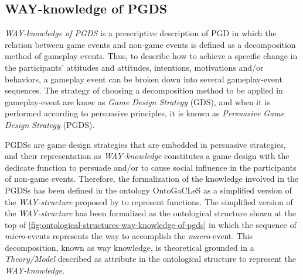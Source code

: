 \subsection{WAY-knowledge of PGDS}
\label{subsec:way-knowledge-of-persuasive-game-design}

\emph{WAY-knowledge of PGDS} is a prescriptive description of PGD in which the relation between game events and non-game events is defined as a decomposition method of gameplay events. Thus, to describe how to achieve a specific change in the participants' attitudes and attitudes, intentions, motivations and/or behaviors, a gameplay event can be broken down into several gameplay-event sequences. The strategy of choosing a decomposition method to be applied in gameplay-event are know as \emph{Game Design Strategy} (GDS), and when it is performed according to persuasive principles, it is known as \emph{Persuasive Game Design Strategy} (PGDS).

PGDSs are game design strategies that are embedded in persuasive strategies, and their representation as \emph{WAY-knowledge} constitutes a game design with the dedicate function to persuade and/or to cause social influence in the participants of non-game events. Therefore, the formalization of the knowledge involved in the PGDSs has been defined in the ontology OntoGaCLeS as a simplified version of the \emph{WAY-structure} proposed by  to represent functions. The simplified version of the \emph{WAY-structure} has been formalized as the ontological structure  shown at the top of \autoref{fig:ontological-structures-way-knowledge-of-pgds} in which the sequence of \emph{micro}-events represents the way to accomplish the \emph{macro}-event. This decomposition, known as way knowledge, is theoretical grounded in a \emph{Theory/Model} described as attribute  in the ontological structure to represent the \emph{WAY-knowledge}.

